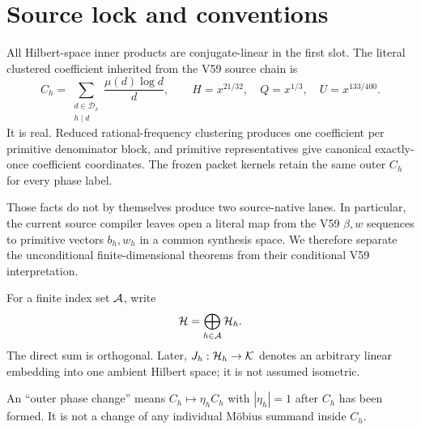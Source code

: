 \section{Source lock and conventions}

All Hilbert-space inner products are conjugate-linear in the first slot.  The
literal clustered coefficient inherited from the V59 source chain is
\[
C_h=\sum_{\substack{d\in\mathcal D_x\\h\mid d}}
       \frac{\mu(d)\log d}{d},
\qquad
H=x^{21/32},\quad Q=x^{1/3},\quad U=x^{133/400}.
\]
It is real.  Reduced rational-frequency clustering produces one coefficient
per primitive denominator block, and primitive representatives give canonical
exactly-once coefficient coordinates.  The frozen packet kernels retain the
same outer $C_h$ for every phase label.

Those facts do not by themselves produce two source-native lanes.  In
particular, the current source compiler leaves open a literal map from the V59
$\beta,w$ sequences to primitive vectors $b_h,w_h$ in a common synthesis
space.  We therefore separate the unconditional finite-dimensional theorems
from their conditional V59 interpretation.

For a finite index set $\mathcal A$, write
\[
\mathcal H=\bigoplus_{h\in\mathcal A}\mathcal H_h.
\]
The direct sum is orthogonal.  Later, $J_h:\mathcal H_h\to\mathcal K$ denotes an arbitrary
linear embedding into one ambient Hilbert space; it is not assumed isometric.

An ``outer phase change'' means $C_h\mapsto\eta_hC_h$ with
$|\eta_h|=1$ after $C_h$ has been formed.  It is not a change of any individual
Möbius summand inside $C_h$.
